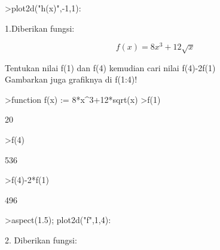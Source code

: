 \documentclass[a4paper,10pt]{article}
\begin{document}
\begin{eulernotebook}
\begin{eulercomment}
\begin{eulercomment}
\begin{euleroutput}
\end{euleroutput}
\begin{eulerprompt}
>plot2d("h(x)",-1,1):
\end{eulerprompt}
\begin{eulercomment}
\end{eulercomment}
\begin{eulercomment}
1.Diberikan fungsi:\\
\end{eulercomment}
\begin{eulerformula}
\[
f(x) = 8x^3+12\sqrt x
\]
\end{eulerformula}
\begin{eulercomment}
Tentukan nilai f(1) dan f(4) kemudian cari nilai f(4)-2f(1)\\
Gambarkan juga grafiknya di f(1:4)!
\end{eulercomment}
\begin{eulerprompt}
>function f(x) := 8*x^3+12*sqrt(x)
>f(1)
\end{eulerprompt}
\begin{euleroutput}
  20
\end{euleroutput}
\begin{eulerprompt}
>f(4)
\end{eulerprompt}
\begin{euleroutput}
  536
\end{euleroutput}
\begin{eulerprompt}
>f(4)-2*f(1)
\end{eulerprompt}
\begin{euleroutput}
  496
\end{euleroutput}
\begin{eulerprompt}
>aspect(1.5); plot2d("f",1,4):
\end{eulerprompt}
\begin{eulercomment}
2. Diberikan fungsi:


\end{eulercomment}
\end{eulercomment}
\end{eulercomment}
\end{eulernotebook}
\end{document}
